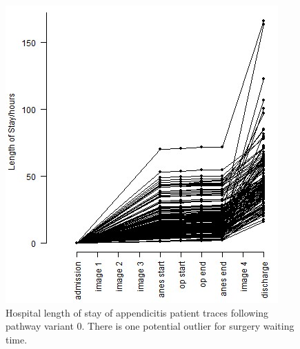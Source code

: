 \documentclass{elsarticle}
\begin{document}
\begin{figure}[t]
    \centering
    \begin{minipage}{0.48\textwidth}
        \centering
        \includegraphics[width=\textwidth]{images/appendicitis_variant_length_of_stay_0_journal.jpg}
        \caption{Hospital length of stay of appendicitis patient traces following pathway variant 0. There is one potential outlier for surgery waiting time.}
        \label{fig:appendicitis length of stay variant 0}
    \end{minipage}\hfill
    \begin{minipage}{0.48\textwidth}
        \centering

\end{minipage}
\end{figure}
\end{document}
